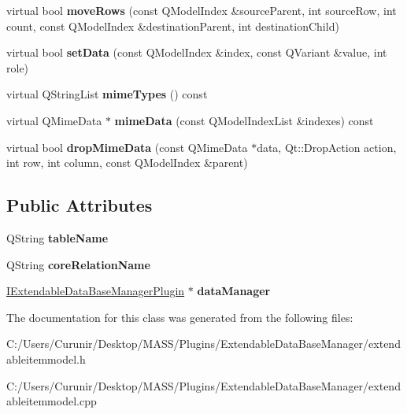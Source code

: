 \begin{DoxyCompactItemize}
virtual bool {\bfseries move\+Rows} (const Q\+Model\+Index \&source\+Parent, int source\+Row, int count, const Q\+Model\+Index \&destination\+Parent, int destination\+Child)
\item 
\mbox{\label{class_extendable_item_model_a8dd835fbda7d078df7b57253fe05712a}} 
virtual bool {\bfseries set\+Data} (const Q\+Model\+Index \&index, const Q\+Variant \&value, int role)
\item 
\mbox{\label{class_extendable_item_model_ab54a2f3ff7d15f81bb092e14f60f7e3b}} 
virtual Q\+String\+List {\bfseries mime\+Types} () const
\item 
\mbox{\label{class_extendable_item_model_aca88d8b2053673df21d519c3e606a414}} 
virtual Q\+Mime\+Data $\ast$ {\bfseries mime\+Data} (const Q\+Model\+Index\+List \&indexes) const
\item 
\mbox{\label{class_extendable_item_model_a7fae485a9730a567ab5071a788a47581}} 
virtual bool {\bfseries drop\+Mime\+Data} (const Q\+Mime\+Data $\ast$data, Qt\+::\+Drop\+Action action, int row, int column, const Q\+Model\+Index \&parent)
\end{DoxyCompactItemize}
\subsection*{Public Attributes}
\begin{DoxyCompactItemize}
\item 
\mbox{\label{class_extendable_item_model_a41d1ee82e5e9d049fc59a672a5a1bcac}} 
Q\+String {\bfseries table\+Name}
\item 
\mbox{\label{class_extendable_item_model_a05024d7077bdcd12ce918a8e01ec11e9}} 
Q\+String {\bfseries core\+Relation\+Name}
\item 
\mbox{\label{class_extendable_item_model_a124bbba7be0bd4fd344f8db064c734e6}} 
\hyperlink{class_i_extendable_data_base_manager_plugin}{I\+Extendable\+Data\+Base\+Manager\+Plugin} $\ast$ {\bfseries data\+Manager}
\end{DoxyCompactItemize}


The documentation for this class was generated from the following files\+:\begin{DoxyCompactItemize}
\item 
C\+:/\+Users/\+Curunir/\+Desktop/\+M\+A\+S\+S/\+Plugins/\+Extendable\+Data\+Base\+Manager/extendableitemmodel.\+h\item 
C\+:/\+Users/\+Curunir/\+Desktop/\+M\+A\+S\+S/\+Plugins/\+Extendable\+Data\+Base\+Manager/extendableitemmodel.\+cpp\end{DoxyCompactItemize}
